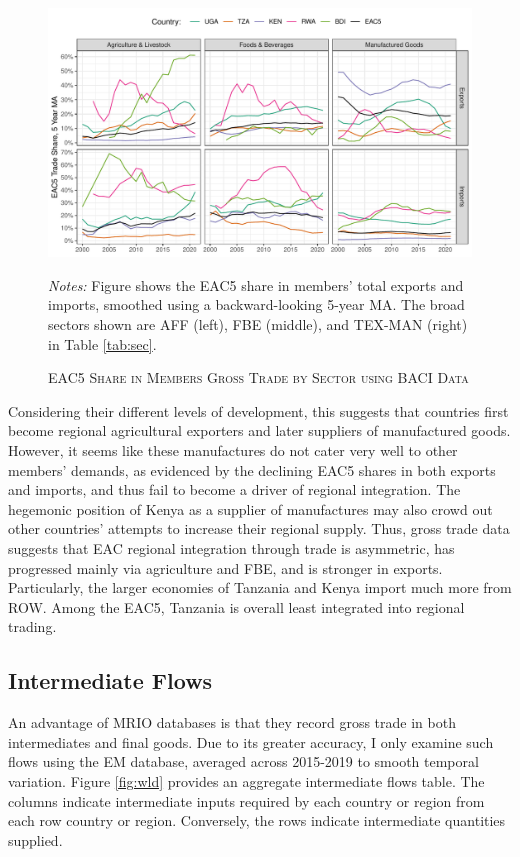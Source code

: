 \documentclass[a4paper]{article}
\begin{document}
\begin{figure}[h!] 
\centering
\caption{\label{fig:GTEACsharesSec}\textsc{EAC5 Share in Members Gross Trade by Sector using BACI Data}}
\includegraphics[width=\textwidth, trim= {0 0 0 0}, clip]{"Figures/GT_EAC5_shares_sec_ts.pdf"} \raggedright
\scriptsize 
\emph{Notes:} Figure shows the EAC5 share in members' total exports and imports, smoothed using a backward-looking 5-year MA. The broad sectors shown are AFF (left), FBE (middle), and TEX-MAN (right) in Table \ref{tab:sec}.
\end{figure}
\FloatBarrier

Considering their different levels of development, this suggests that countries first become regional agricultural exporters and later suppliers of manufactured goods. However, it seems like these manufactures do not cater very well to other members' demands, as evidenced by the declining EAC5 shares in both exports and imports, and thus fail to become a driver of regional integration. The hegemonic position of Kenya as a supplier of manufactures may also crowd out other countries' attempts to increase their regional supply. Thus, gross trade data suggests that EAC regional integration through trade is asymmetric, has progressed mainly via agriculture and FBE, and is stronger in exports. Particularly, the larger economies of Tanzania and Kenya import much more from ROW. Among the EAC5, Tanzania is overall least integrated into regional trading. 

\subsection{Intermediate Flows}

An advantage of MRIO databases is that they record gross trade in both intermediates and final goods. Due to its greater accuracy, I only examine such flows using the EM database, averaged across 2015-2019 to smooth temporal variation. Figure \ref{fig:wld} provides an aggregate intermediate flows table. The columns indicate intermediate inputs required by each country or region from each row country or region. Conversely, the rows indicate intermediate quantities supplied. \newline  
\end{document}
